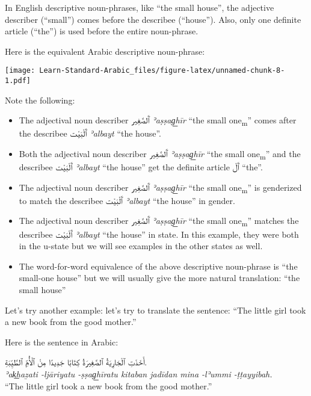 \documentclass[
  10pt,
]{book}
\providecommand{\tightlist}{%
  \setlength{\itemsep}{0pt}\setlength{\parskip}{0pt}}
\begin{document}
In English descriptive noun-phrases, like \enquote{the small house}, the adjective describer (\enquote{small}) comes before the describee (\enquote{house}). Also, only one definite article (\enquote{the}) is used before the entire noun-phrase.

Here is the equivalent Arabic descriptive noun-phrase:

\texttt{[image: Learn-Standard-Arabic\_files/figure-latex/unnamed-chunk-8-1.pdf]}

Note the following:

\begin{itemize}
\tightlist
\item
  The adjectival noun describer \foreignlanguage{arabic}{ٱَلصَّغِير} \emph{ʾaṣṣag͟hīr} \enquote{the small one\textsubscript{m}} comes after the describee \foreignlanguage{arabic}{ٱَلْبَيْت} \emph{ʾalbayt} \enquote{the house}.
\item
  Both the adjectival noun describer \foreignlanguage{arabic}{ٱَلصَّغِير} \emph{ʾaṣṣag͟hīr} \enquote{the small one\textsubscript{m}} and the describee \foreignlanguage{arabic}{ٱَلْبَيْت} \emph{ʾalbayt} \enquote{the house} get the definite article \foreignlanguage{arabic}{ٱَلْ} \enquote{the}.
\item
  The adjectival noun describer \foreignlanguage{arabic}{ٱَلصَّغِير} \emph{ʾaṣṣag͟hīr} \enquote{the small one\textsubscript{m}} is genderized to match the describee \foreignlanguage{arabic}{ٱَلْبَيْت} \emph{ʾalbayt} \enquote{the house} in gender.
\item
  The adjectival noun describer \foreignlanguage{arabic}{ٱَلصَّغِير} \emph{ʾaṣṣag͟hīr} \enquote{the small one\textsubscript{m}} matches the describee \foreignlanguage{arabic}{ٱَلْبَيْت} \emph{ʾalbayt} \enquote{the house} in state. In this example, they were both in the u-state but we will see examples in the other states as well.
\item
  The word-for-word equivalence of the above descriptive noun-phrase is \enquote{the small-one house} but we will usually give the more natural translation: \enquote{the small house}
\end{itemize}

Let's try another example: let's try to translate the sentence: \enquote{The little girl took a new book from the good mother.}

Here is the sentence in Arabic:

\foreignlanguage{arabic}{أَخَذَتِ ٱلْجَارِيَةُ ٱلصَّغِيرَةُ کِتَابًا جَدِيدًا مِنْ ٱلْأُمِّ ٱلطَّيِّبَةِ.}\\
\emph{ʾak͟haẕati -ljāriyatu -ṣṣag͟hīratu kitaban jadīdan mina -lʾummi -ṭṭayyibah.}\\
\enquote{The little girl took a new book from the good mother.}
\end{document}
